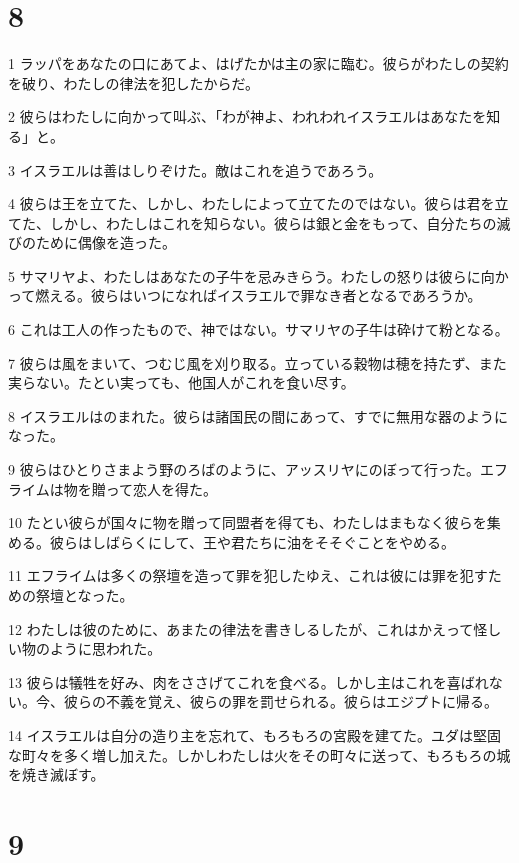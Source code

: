 \chapter{8}

\par 1 ラッパをあなたの口にあてよ、はげたかは主の家に臨む。彼らがわたしの契約を破り、わたしの律法を犯したからだ。
\par 2 彼らはわたしに向かって叫ぶ、「わが神よ、われわれイスラエルはあなたを知る」と。
\par 3 イスラエルは善はしりぞけた。敵はこれを追うであろう。
\par 4 彼らは王を立てた、しかし、わたしによって立てたのではない。彼らは君を立てた、しかし、わたしはこれを知らない。彼らは銀と金をもって、自分たちの滅びのために偶像を造った。
\par 5 サマリヤよ、わたしはあなたの子牛を忌みきらう。わたしの怒りは彼らに向かって燃える。彼らはいつになればイスラエルで罪なき者となるであろうか。
\par 6 これは工人の作ったもので、神ではない。サマリヤの子牛は砕けて粉となる。
\par 7 彼らは風をまいて、つむじ風を刈り取る。立っている穀物は穂を持たず、また実らない。たとい実っても、他国人がこれを食い尽す。
\par 8 イスラエルはのまれた。彼らは諸国民の間にあって、すでに無用な器のようになった。
\par 9 彼らはひとりさまよう野のろばのように、アッスリヤにのぼって行った。エフライムは物を贈って恋人を得た。
\par 10 たとい彼らが国々に物を贈って同盟者を得ても、わたしはまもなく彼らを集める。彼らはしばらくにして、王や君たちに油をそそぐことをやめる。
\par 11 エフライムは多くの祭壇を造って罪を犯したゆえ、これは彼には罪を犯すための祭壇となった。
\par 12 わたしは彼のために、あまたの律法を書きしるしたが、これはかえって怪しい物のように思われた。
\par 13 彼らは犠牲を好み、肉をささげてこれを食べる。しかし主はこれを喜ばれない。今、彼らの不義を覚え、彼らの罪を罰せられる。彼らはエジプトに帰る。
\par 14 イスラエルは自分の造り主を忘れて、もろもろの宮殿を建てた。ユダは堅固な町々を多く増し加えた。しかしわたしは火をその町々に送って、もろもろの城を焼き滅ぼす。

\chapter{9}

